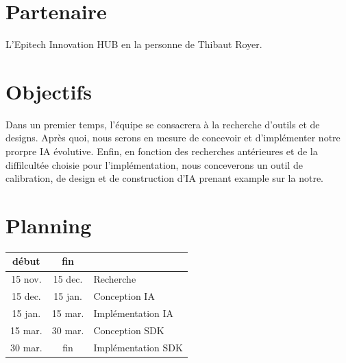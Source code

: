 \documentclass[a4paper]{report}
\begin{document}
  \section*{Partenaire}
  L'Epitech Innovation HUB en la personne de Thibaut Royer.

  \section*{Objectifs}
  Dans un premier temps, l'\'equipe se consacrera à la recherche d'outils et de designs.
  Après quoi, nous serons en mesure de concevoir et d'impl\'ementer notre prorpre IA \'evolutive.
  Enfin, en fonction des recherches ant\'erieures et de la diffilcult\'ee choisie pour l'impl\'ementation, nous conceverons un outil de calibration, de design et de construction d'IA prenant example sur la notre.

  \section*{Planning}
  \begin{tabular}{c c|l}
    \hline
      d\'ebut & fin & \\
    \hline
      15 nov. & 15 dec. & Recherche \\
      15 dec. & 15 jan. & Conception IA \\
      15 jan. & 15 mar. & Impl\'ementation IA \\
      15 mar. & 30 mar. & Conception SDK\\
      30 mar. & fin & Impl\'ementation SDK\\
    \hline
  \end{tabular}
\end{document}
